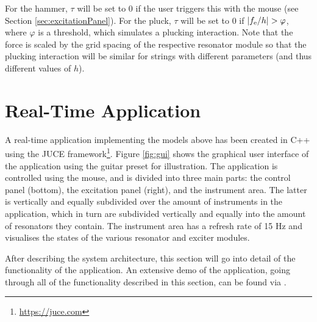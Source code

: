\documentclass{article}
\begin{document}
For the hammer, $\tau$ will be set to 0 if the user triggers this with the mouse (see Section \ref{sec:excitationPanel}). For the pluck, $\tau$ will be set to 0 if $|f_{\text{e}} / h| > \varphi$, where $\varphi$ is a threshold, which simulates a plucking interaction. Note that the force is scaled by the grid spacing of the respective resonator module so that the plucking interaction will be similar for strings with different parameters (and thus different values of $h$). 

\section{Real-Time Application}\label{sec:application}
A real-time application implementing the models above has been created in C++ using the JUCE framework\footnote{\url{https://juce.com}}. Figure \ref{fig:gui} shows the graphical user interface of the application using the guitar preset for illustration. The application is controlled using the mouse, and is divided into three main parts: the control panel (bottom), the excitation panel (right), and the instrument area. The latter is vertically and equally subdivided over the amount of instruments in the application, which in turn are subdivided vertically and equally into the amount of resonators they contain. The instrument area has a refresh rate of 15 Hz and visualises the states of the various resonator and exciter modules.  

After describing the system architecture, this section will go into detail of the functionality of the application.
An extensive demo of the application, going through all of the functionality described in this section, can be found via \cite{demo}.
\end{document}
